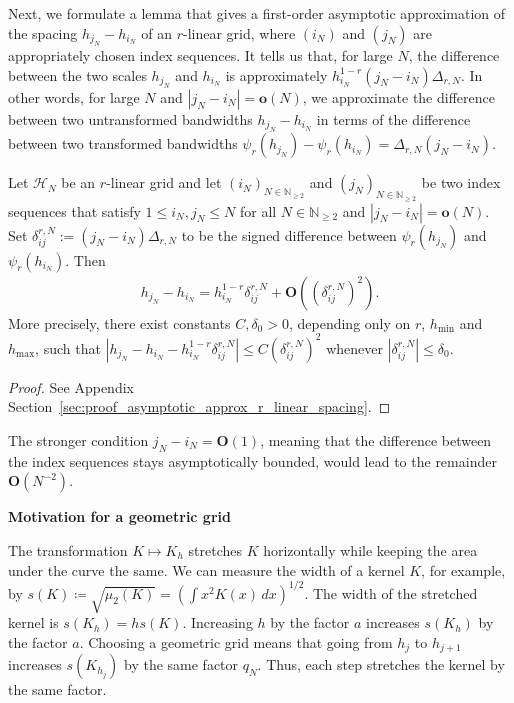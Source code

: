 Next, we formulate a lemma that gives a first-order asymptotic approximation of the spacing $h_{j_N}-h_{i_N}$ of an $r$-linear grid, where $(i_N)$ and $(j_N)$ are appropriately chosen index sequences. It tells us that, for large $N$, the difference between the two scales $h_{j_N}$ and $h_{i_N}$ is approximately $h_{i_N}^{1-r}(j_N-i_N)\Delta_{r,N}$. In other words, for large $N$ and $|j_N-i_N|=\mathbf{o}(N)$, we approximate the difference between two untransformed bandwidths $h_{j_N}-h_{i_N}$ in terms of the difference between two transformed bandwidths $\psi_r(h_{j_N})-\psi_r(h_{i_N})=\Delta_{r,N}(j_N-i_N)$.

\begin{Lem}\label{lem:asymptotic_approx_r_linear_spacing}
    Let $\mathcal{H}_N$ be an $r$-linear grid and let $(i_N)_{N\in\mathbb{N}_{\ge2}}$ and $(j_N)_{N\in\mathbb{N}_{\ge2}}$ be two index sequences that satisfy $1\le i_N,j_N\le N$ for all $N\in\mathbb{N}_{\ge2}$ and $|j_N-i_N|=\mathbf{o}(N)$. Set $\delta^{r,N}_{ij}:=(j_N-i_N)\Delta_{r,N}$ to be the signed difference between $\psi_r(h_{j_N})$ and $\psi_r(h_{i_N})$. Then
    \begin{align*}
        h_{j_N}-h_{i_N}=h_{i_N}^{1-r}\delta_{ij}^{r,N}+\mathbf{O}((\delta_{ij}^{r,N})^2).
    \end{align*}
    More precisely, there exist constants $C,\delta_0>0$, depending only on $r$, $h_{\min}$ and $h_{\max}$, such that $|h_{j_N}-h_{i_N}-h_{i_N}^{1-r}\delta_{ij}^{r,N}|\le C(\delta_{ij}^{r,N})^2$ whenever $|\delta_{ij}^{r,N}|\le\delta_0$.
\end{Lem}

\begin{proof}
    See Appendix Section~\ref{sec:proof_asymptotic_approx_r_linear_spacing}.
\end{proof}



The stronger condition $j_N-i_N=\mathbf{O}(1)$, meaning that the difference between the index sequences stays asymptotically bounded, would lead to the remainder $\mathbf{O}(N^{-2})$.

\textbf{Motivation for a geometric grid}

The transformation $K\mapsto K_h$ stretches $K$ horizontally while keeping the area under the curve the same. We can measure the width of a kernel $K$, for example, by $s(K)\coloneqq\sqrt{\mu_2(K)}=(\int x^2K(x)\,dx)^{1/2}$. The width of the stretched kernel is $s(K_h)=hs(K)$. Increasing $h$ by the factor $a$ increases $s(K_h)$ by the factor $a$. Choosing a geometric grid means that going from $h_j$ to $h_{j+1}$ increases $s(K_{h_j})$ by the same factor $q_N$. Thus, each step stretches the kernel by the same factor.

